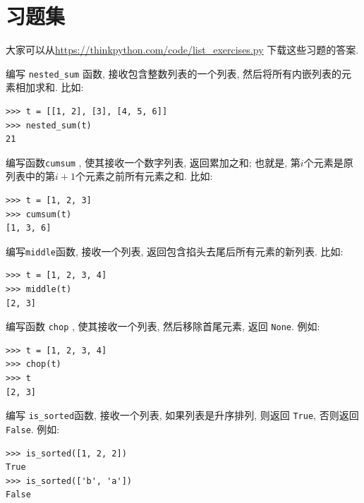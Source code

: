 \documentclass[10pt]{book}
\begin{document}
\section{习题集}

大家可以从\url{https://thinkpython.com/code/list_exercises.py}
下载这些习题的答案.

\begin{exercise}

编写 \verb"nested_sum" 函数, 接收包含整数列表的一个列表, 
然后将所有内嵌列表的元素相加求和. 
比如:

\begin{verbatim}
>>> t = [[1, 2], [3], [4, 5, 6]]
>>> nested_sum(t)
21
\end{verbatim}

\end{exercise}

\begin{exercise}
\label{cumulative}
编写函数{\tt cumsum} , 使其接收一个数字列表, 返回累加之和;
也就是, 第$i$个元素是原列表中的第$i+1$个元素之前所有元素之和. 
比如:

\begin{verbatim}
>>> t = [1, 2, 3]
>>> cumsum(t)
[1, 3, 6]
\end{verbatim}

\end{exercise}

\begin{exercise}

编写\verb"middle"函数, 接收一个列表, 返回包含掐头去尾后所有元素的新列表. 
比如:

\begin{verbatim}
>>> t = [1, 2, 3, 4]
>>> middle(t)
[2, 3]
\end{verbatim}

\end{exercise}

\begin{exercise}
编写函数 \verb"chop" , 使其接收一个列表, 然后移除首尾元素, 返回 {\tt None}.
例如:

\begin{verbatim}
>>> t = [1, 2, 3, 4]
>>> chop(t)
>>> t
[2, 3]
\end{verbatim}

\end{exercise}


\begin{exercise}
编写 \verb"is_sorted"函数, 接收一个列表, 如果列表是升序排列, 则返回 {\tt True}, 
否则返回 {\tt False}. 例如:

\begin{verbatim}
>>> is_sorted([1, 2, 2])
True
>>> is_sorted(['b', 'a'])
False
\end{verbatim}

\end{exercise}
\end{document}
